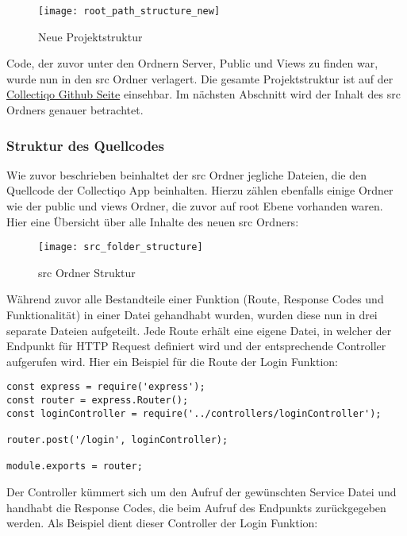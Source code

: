 \newpage

\begin{figure}[h]
  \centering
  \texttt{[image: root\_path\_structure\_new]}
  \caption{Neue Projektstruktur}
  \label{fig:root_path_strucutr_new}
\end{figure}
Code, der zuvor unter den Ordnern Server, Public und Views zu finden war, wurde nun in den src Ordner verlagert.
Die gesamte Projektstruktur ist auf der \href{https://github.com/LorackDev/collectiqo}{Collectiqo Github Seite} einsehbar.
Im nächsten Abschnitt wird der Inhalt des src Ordners genauer betrachtet.

\subsubsection{Struktur des Quellcodes}
Wie zuvor beschrieben beinhaltet der src Ordner jegliche Dateien, die den Quellcode der Collectiqo App beinhalten.
Hierzu zählen ebenfalls einige Ordner wie der public und views Ordner, die zuvor auf root Ebene vorhanden waren.
Hier eine Übersicht über alle Inhalte des neuen src Ordners:
\begin{figure}[h]
  \centering
  \texttt{[image: src\_folder\_structure]}
  \caption{src Ordner Struktur}
  \label{fig:src_folder_structure}
\end{figure}

\newpage

Während zuvor alle Bestandteile einer Funktion (Route, Response Codes und Funktionalität) in einer Datei gehandhabt wurden, wurden diese nun in drei separate Dateien aufgeteilt.
Jede Route erhält eine eigene Datei, in welcher der Endpunkt für HTTP Request definiert wird und der entsprechende Controller aufgerufen wird.
Hier ein Beispiel für die Route der Login Funktion:

\vspace{1em}
\lstset{language=javascript}
\begin{lstlisting}[label={lst:lst-login-route}]
const express = require('express');
const router = express.Router();
const loginController = require('../controllers/loginController');

router.post('/login', loginController);

module.exports = router;
\end{lstlisting}
\vspace{1em}


Der Controller kümmert sich um den Aufruf der gewünschten Service Datei und handhabt die Response Codes, die beim Aufruf des Endpunkts zurückgegeben werden.
Als Beispiel dient dieser Controller der Login Funktion:

